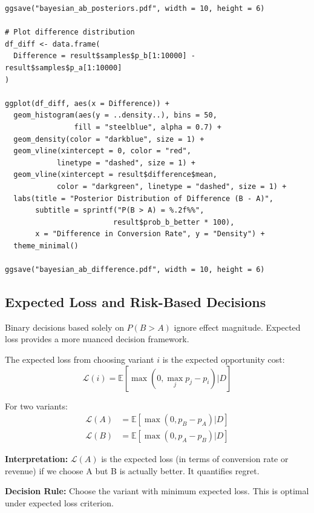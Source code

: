 \begin{lstlisting}
ggsave("bayesian_ab_posteriors.pdf", width = 10, height = 6)

# Plot difference distribution
df_diff <- data.frame(
  Difference = result$samples$p_b[1:10000] - result$samples$p_a[1:10000]
)

ggplot(df_diff, aes(x = Difference)) +
  geom_histogram(aes(y = ..density..), bins = 50,
                fill = "steelblue", alpha = 0.7) +
  geom_density(color = "darkblue", size = 1) +
  geom_vline(xintercept = 0, color = "red",
            linetype = "dashed", size = 1) +
  geom_vline(xintercept = result$difference$mean,
            color = "darkgreen", linetype = "dashed", size = 1) +
  labs(title = "Posterior Distribution of Difference (B - A)",
       subtitle = sprintf("P(B > A) = %.2f%%",
                         result$prob_b_better * 100),
       x = "Difference in Conversion Rate", y = "Density") +
  theme_minimal()

ggsave("bayesian_ab_difference.pdf", width = 10, height = 6)
\end{lstlisting}

\subsection{Expected Loss and Risk-Based Decisions}

Binary decisions based solely on $P(B > A)$ ignore effect magnitude. Expected loss provides a more nuanced decision framework.

\begin{definition}
The expected loss from choosing variant $i$ is the expected opportunity cost:
\begin{equation}
\mathcal{L}(i) = \mathbb{E}[\max(0, \max_j p_j - p_i) | D]
\end{equation}

For two variants:
\begin{align}
\mathcal{L}(A) &= \mathbb{E}[\max(0, p_B - p_A) | D] \\
\mathcal{L}(B) &= \mathbb{E}[\max(0, p_A - p_B) | D]
\end{align}
\end{definition}

\textbf{Interpretation:} $\mathcal{L}(A)$ is the expected loss (in terms of conversion rate or revenue) if we choose A but B is actually better. It quantifies regret.

\textbf{Decision Rule:} Choose the variant with minimum expected loss. This is optimal under expected loss criterion.

